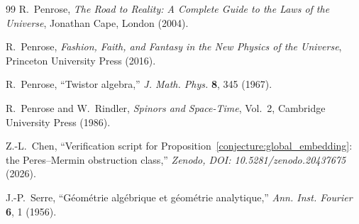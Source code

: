 \documentclass[11pt,a4paper]{article}
\theoremstyle{remark}
\begin{document}
\begin{thebibliography}{99}
R.~Penrose,
\textit{The Road to Reality: A Complete Guide to the Laws of the Universe},
Jonathan Cape, London (2004).

R.~Penrose,
\textit{Fashion, Faith, and Fantasy in the New Physics of the Universe},
Princeton University Press (2016).

R.~Penrose,
``Twistor algebra,''
\textit{J. Math. Phys.} \textbf{8}, 345 (1967).

R.~Penrose and W.~Rindler,
\textit{Spinors and Space-Time}, Vol.\ 2,
Cambridge University Press (1986).

Z.-L.~Chen,
``Verification script for
Proposition~\ref{conjecture:global_embedding}:
the Peres--Mermin obstruction class,''
\textit{Zenodo, DOI: 10.5281/zenodo.20437675} (2026).

J.-P.~Serre,
``G\'eom\'etrie alg\'ebrique et g\'eom\'etrie analytique,''
\textit{Ann. Inst. Fourier} \textbf{6}, 1 (1956).

\end{thebibliography}
\end{document}
